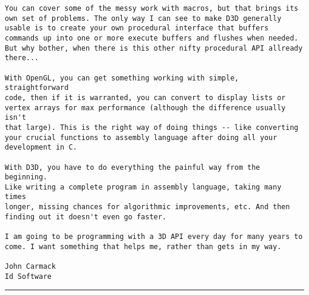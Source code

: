 \begin{verbatim}
You can cover some of the messy work with macros, but that brings its 
own set of problems. The only way I can see to make D3D generally 
usable is to create your own procedural interface that buffers 
commands up into one or more execute buffers and flushes when needed. 
But why bother, when there is this other nifty procedural API allready 
there... 

With OpenGL, you can get something working with simple, straightforward
code, then if it is warranted, you can convert to display lists or 
vertex arrays for max performance (although the difference usually isn't
that large). This is the right way of doing things -- like converting 
your crucial functions to assembly language after doing all your 
development in C. 

With D3D, you have to do everything the painful way from the beginning. 
Like writing a complete program in assembly language, taking many times 
longer, missing chances for algorithmic improvements, etc. And then 
finding out it doesn't even go faster. 

I am going to be programming with a 3D API every day for many years to 
come. I want something that helps me, rather than gets in my way. 

John Carmack 
Id Software 

\end{verbatim}
 \hrule
